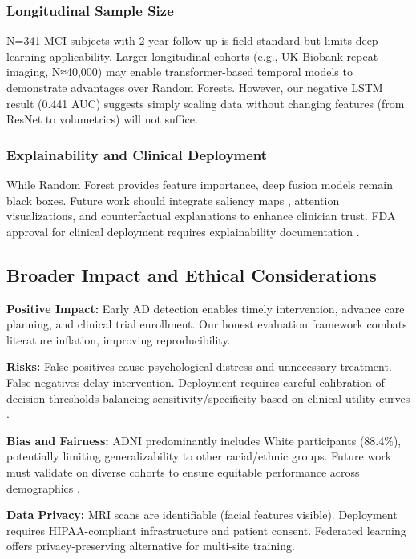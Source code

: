 \documentclass[conference]{IEEEtran}
\begin{document}
\subsubsection{Longitudinal Sample Size}

N=341 MCI subjects with 2-year follow-up is field-standard \cite{Spasov2019, Venugopalan2021} but limits deep learning applicability. Larger longitudinal cohorts (e.g., UK Biobank repeat imaging, N≈40,000) \cite{Sudlow2015} may enable transformer-based temporal models to demonstrate advantages over Random Forests. However, our negative LSTM result (0.441 AUC) suggests simply scaling data without changing features (from ResNet to volumetrics) will not suffice.

\subsubsection{Explainability and Clinical Deployment}

While Random Forest provides feature importance, deep fusion models remain black boxes. Future work should integrate saliency maps \cite{Selvaraju2017}, attention visualizations, and counterfactual explanations \cite{Wachter2017} to enhance clinician trust. FDA approval for clinical deployment requires explainability documentation \cite{FDA2021}.

\subsection{Broader Impact and Ethical Considerations}

\textbf{Positive Impact:} Early AD detection enables timely intervention, advance care planning, and clinical trial enrollment. Our honest evaluation framework combats literature inflation, improving reproducibility.

\textbf{Risks:} False positives cause psychological distress and unnecessary treatment. False negatives delay intervention. Deployment requires careful calibration of decision thresholds balancing sensitivity/specificity based on clinical utility curves \cite{Vickers2006}.

\textbf{Bias and Fairness:} ADNI predominantly includes White participants (88.4\%), potentially limiting generalizability to other racial/ethnic groups. Future work must validate on diverse cohorts to ensure equitable performance across demographics \cite{Obermeyer2019}.

\textbf{Data Privacy:} MRI scans are identifiable (facial features visible). Deployment requires HIPAA-compliant infrastructure and patient consent. Federated learning \cite{Sheller2020} offers privacy-preserving alternative for multi-site training.
\end{document}
